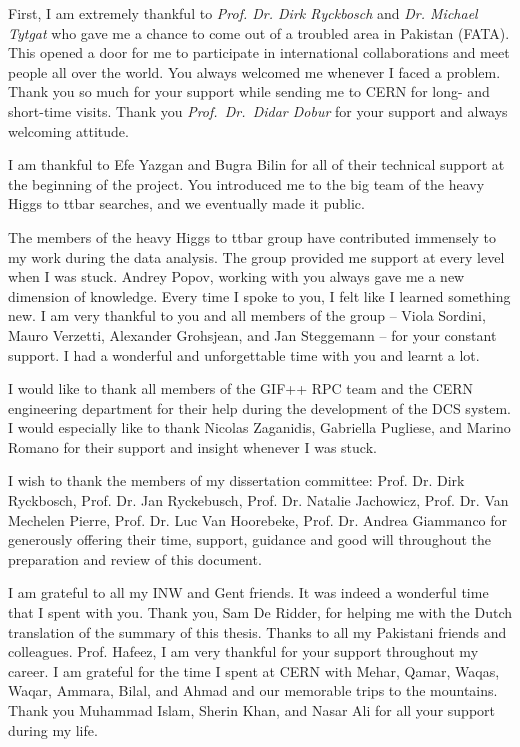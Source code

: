 \documentclass[10pt,a4paper,twoside,openright,dutch,english]{book}
\begin{document}
First, I am extremely thankful to \textit{Prof. Dr. Dirk Ryckbosch} and \textit{Dr. Michael Tytgat} who gave me a chance to come out of a troubled area in Pakistan (FATA). This opened a door for me to participate in international collaborations and meet people all over the world. You always welcomed me whenever I faced a problem. Thank you so much for your support while sending me to CERN for long- and short-time visits. Thank you \textit{Prof.\ Dr.\ Didar Dobur} for your support and always welcoming attitude. 

I am thankful to Efe Yazgan and Bugra Bilin for all of their technical support at the beginning of the project. You introduced me to the big team of the heavy Higgs to ttbar searches, and we eventually made it public.

The members of the heavy Higgs to ttbar group have contributed immensely to my work during the data analysis. The group provided me support at every level when I was stuck. Andrey Popov, working with you always gave me a new dimension of knowledge. Every time I spoke to you, I felt like I learned something new. I am very thankful to you and all members of the group – Viola Sordini, Mauro Verzetti, Alexander Grohsjean, and Jan Steggemann – for your constant support. I had a wonderful and unforgettable time with you and learnt a lot.

I would like to thank all members of the GIF++ RPC team and the CERN engineering department for their help during the development of the DCS system. I would especially like to thank Nicolas Zaganidis, Gabriella Pugliese, and Marino Romano for their support and insight whenever I was stuck.

I wish to thank the members of my dissertation committee: Prof. Dr. Dirk Ryckbosch, Prof. Dr. Jan Ryckebusch, Prof. Dr. Natalie Jachowicz, Prof. Dr. Van Mechelen Pierre, Prof. Dr. Luc Van Hoorebeke, Prof. Dr. Andrea Giammanco for generously offering their time, support, guidance and good will throughout the preparation and review of this document.

I am grateful to all my INW and Gent friends. It was indeed a wonderful time that I spent with you. Thank you, Sam De Ridder, for helping me with the Dutch translation of the summary of this thesis. Thanks to all my Pakistani friends and colleagues. Prof. Hafeez, I am very thankful for your support throughout my career. I am grateful for the time I spent at CERN with Mehar, Qamar, Waqas, Waqar, Ammara, Bilal, and Ahmad and our memorable trips to the mountains. Thank you Muhammad Islam, Sherin Khan, and Nasar Ali for all your support during my life.     
\end{document}
